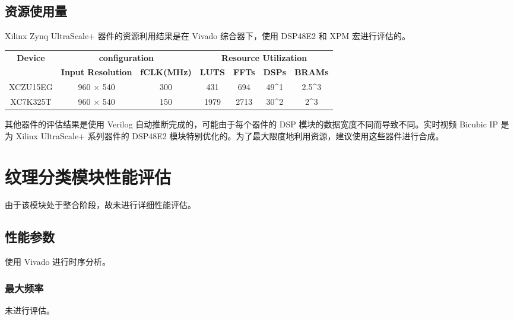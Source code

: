 \documentclass[12pt, a4paper, oneside]{ctexbook}
\begin{document}
	\section{资源使用量}
	Xilinx Zynq UltraScale+ 器件的资源利用结果是在 Vivado 综合器下，使用 DSP48E2 和 XPM 宏进行评估的。\par	
	\begin{table}[h]
		\begin{tabular}{|c|cc|cccc|}
			\hline
			\multirow{2}{*}{\textbf{Device}} & \multicolumn{2}{c|}{\textbf{configuration}}                         & \multicolumn{4}{c|}{\textbf{Resource Utilization}}                                                                                            \\ \cline{2-7} 
			& \multicolumn{1}{c|}{\textbf{Input Resolution}} & \textbf{fCLK(MHz)} & \multicolumn{1}{c|}{\textbf{LUTS}} & \multicolumn{1}{c|}{\textbf{FFTs}} & \multicolumn{1}{c|}{\textbf{DSPs}}         & \textbf{BRAMs}         \\ \hline
			XCZU15EG                         & \multicolumn{1}{c|}{960 × 540}                 & 300                & \multicolumn{1}{c|}{431}           & \multicolumn{1}{c|}{694}           & \multicolumn{1}{c|}{49\textasciicircum{}1} & 2.5\textasciicircum{}3 \\ \hline
			XC7K325T                         & \multicolumn{1}{c|}{960 × 540}                 & 150                & \multicolumn{1}{c|}{1979}          & \multicolumn{1}{c|}{2713}          & \multicolumn{1}{c|}{30\textasciicircum{}2} & 2\textasciicircum{}3   \\ \hline
		\end{tabular}
	\end{table}
	其他器件的评估结果是使用 Verilog 自动推断完成的，可能由于每个器件的 DSP 模块的数据宽度不同而导致不同。实时视频 Bicubic IP 是为 Xilinx UltraScale+ 系列器件的 DSP48E2 模块特别优化的。为了最大限度地利用资源，建议使用这些器件进行合成。
	
	\chapter{纹理分类模块性能评估}
	由于该模块处于整合阶段，故未进行详细性能评估。
	\section{性能参数}
	使用 Vivado 进行时序分析。
		\subsection{最大频率}
		未进行评估。
\end{document}

